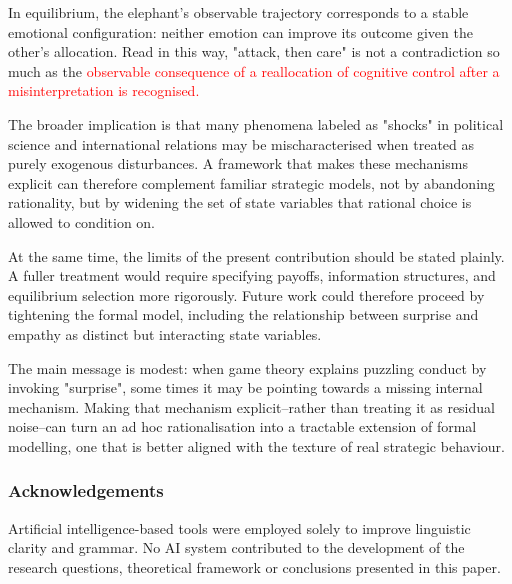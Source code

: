 \vspace*{1em}
In equilibrium, the elephant's observable trajectory corresponds to a stable emotional configuration: neither emotion can improve its outcome given the other's allocation. Read in this way, "attack, then care" is not a contradiction so much as the \textcolor{red}{observable consequence of a reallocation of cognitive control after a misinterpretation is recognised.}

The broader implication is that many phenomena labeled as "shocks" in political science and international relations may be mischaracterised when treated as purely exogenous disturbances.
A framework that makes these mechanisms explicit can therefore complement familiar strategic models, not by abandoning rationality, but by widening the set of state variables that rational choice is allowed to condition on.

\vspace*{1em}
At the same time, the limits of the present contribution should be stated plainly. A fuller treatment would require specifying payoffs, information structures, and equilibrium selection more rigorously. Future work could therefore proceed by tightening the formal model, including the relationship between surprise and empathy as distinct but interacting state variables.

\vspace*{1em}
The main message is modest: when game theory explains puzzling conduct by invoking "surprise", some times it may be pointing towards a missing internal mechanism. Making that mechanism explicit--rather than treating it as residual noise--can turn an ad hoc rationalisation into a tractable extension of formal modelling, one that is better aligned with the texture of real strategic behaviour.

\subsubsection*{Acknowledgements}
Artificial intelligence-based tools were employed solely to improve linguistic clarity and grammar. No AI system contributed to the development of the research questions, theoretical framework or conclusions presented in this paper.